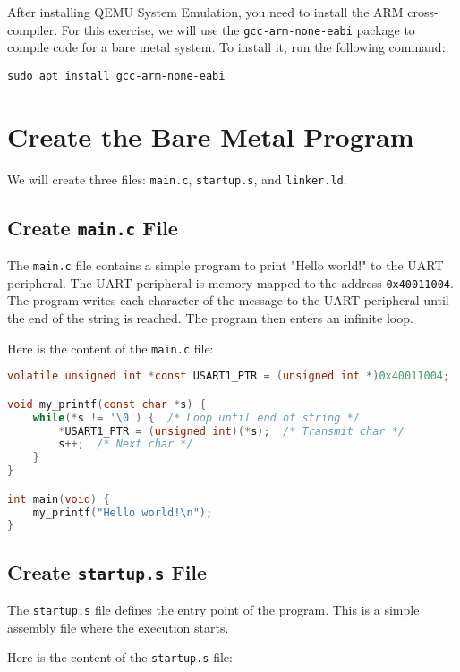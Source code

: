 After installing QEMU System Emulation, you need to install the ARM cross-compiler. For this exercise, we will use the \texttt{gcc-arm-none-eabi} package to compile code for a bare metal system. To install it, run the following command:

\begin{lstlisting}
sudo apt install gcc-arm-none-eabi
\end{lstlisting}

\section*{Create the Bare Metal Program}

We will create three files: \texttt{main.c}, \texttt{startup.s}, and \texttt{linker.ld}.

\subsection*{Create \texttt{main.c} File}

The \texttt{main.c} file contains a simple program to print "Hello world!" to the UART peripheral. The UART peripheral is memory-mapped to the address \texttt{0x40011004}. The program writes each character of the message to the UART peripheral until the end of the string is reached. The program then enters an infinite loop.

Here is the content of the \texttt{main.c} file:

\begin{lstlisting}[language=C]
volatile unsigned int *const USART1_PTR = (unsigned int *)0x40011004;

void my_printf(const char *s) {
    while(*s != '\0') {  /* Loop until end of string */
        *USART1_PTR = (unsigned int)(*s);  /* Transmit char */
        s++;  /* Next char */
    }
}

int main(void) {
    my_printf("Hello world!\n");
}
\end{lstlisting}

\subsection*{Create \texttt{startup.s} File}

The \texttt{startup.s} file defines the entry point of the program. This is a simple assembly file where the execution starts.

Here is the content of the \texttt{startup.s} file:

